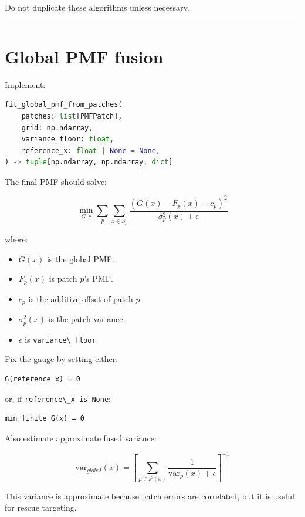 \documentclass[
  10.5pt,
]{article}
\newcommand{\passthrough}[1]{#1}
\providecommand{\tightlist}{%
  \setlength{\itemsep}{0pt}\setlength{\parskip}{0pt}}
\begin{document}
Do not duplicate these algorithms unless necessary.

\begin{center}\rule{0.5\linewidth}{0.5pt}\end{center}

\section{Global PMF fusion}\label{global-pmf-fusion}

Implement:

\begin{lstlisting}[language=Python]
fit_global_pmf_from_patches(
    patches: list[PMFPatch],
    grid: np.ndarray,
    variance_floor: float,
    reference_x: float | None = None,
) -> tuple[np.ndarray, np.ndarray, dict]
\end{lstlisting}

The final PMF should solve:

\[
\min_{G,c}
\sum_p \sum_{x\in S_p}
\frac{(G(x)-F_p(x)-c_p)^2}{\sigma_p^2(x)+\epsilon}
\]

where:

\begin{itemize}
\tightlist
\item
  \(G(x)\) is the global PMF.
\item
  \(F_p(x)\) is patch \(p\)'s PMF.
\item
  \(c_p\) is the additive offset of patch \(p\).
\item
  \(\sigma_p^2(x)\) is the patch variance.
\item
  \(\epsilon\) is \passthrough{\lstinline!variance\_floor!}.
\end{itemize}

Fix the gauge by setting either:

\begin{lstlisting}
G(reference_x) = 0
\end{lstlisting}

or, if \passthrough{\lstinline!reference\_x is None!}:

\begin{lstlisting}
min finite G(x) = 0
\end{lstlisting}

Also estimate approximate fused variance:

\[
\mathrm{var}_{global}(x)
=
\left[
\sum_{p\in \mathcal{P}(x)}
\frac{1}{\mathrm{var}_p(x)+\epsilon}
\right]^{-1}
\]

This variance is approximate because patch errors are correlated, but it
is useful for rescue targeting.
\end{document}
